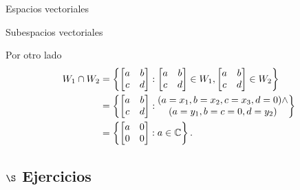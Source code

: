 \begin{chapter}{Espacios vectoriales}
\begin{section}{Subespacios vectoriales}
\begin{ejemplo*}
\begin{enumerate}
            Por otro lado
            \begin{align*}
                W_1 \cap W_2 &= \left\{\begin{bmatrix} a&b\\c&d\end{bmatrix}:  \begin{bmatrix} a&b\\c&d\end{bmatrix} \in W_1, \begin{bmatrix} a&b\\c&d\end{bmatrix} \in W_2\right\} \\
                &= \left\{\begin{bmatrix} a&b\\c&d\end{bmatrix}:  \begin{matrix}
                (a =x_1, b = x_2, c = x_3,d =0)\wedge \\(a = y_1, b=c=0, d= y_2)
                \end{matrix} \right\} \\
                &= \left\{\begin{bmatrix} a&0\\0&0\end{bmatrix}:  a \in \mathbb C\right\} .
            \end{align*}
        \end{enumerate}
    \end{ejemplo*}

    \subsection*{$\S$ Ejercicios}
    \begin{enumex}


\end{enumex}
\end{section}
\end{chapter}

